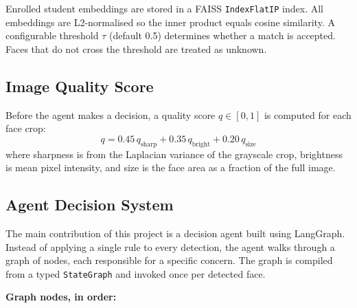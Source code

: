\documentclass[conference]{IEEEtran}
\begin{document}
Enrolled student embeddings are stored in a FAISS \texttt{IndexFlatIP} index. All embeddings are L2-normalised so the inner product equals cosine similarity. A configurable threshold $\tau$ (default 0.5) determines whether a match is accepted. Faces that do not cross the threshold are treated as unknown.

\subsection{Image Quality Score}

Before the agent makes a decision, a quality score $q \in [0,1]$ is computed for each face crop:
\[
q = 0.45\,q_{\text{sharp}} + 0.35\,q_{\text{bright}} + 0.20\,q_{\text{size}}
\]
where sharpness is from the Laplacian variance of the grayscale crop, brightness is mean pixel intensity, and size is the face area as a fraction of the full image.

\subsection{Agent Decision System}

The main contribution of this project is a decision agent built using LangGraph. Instead of applying a single rule to every detection, the agent walks through a graph of nodes, each responsible for a specific concern. The graph is compiled from a typed \texttt{StateGraph} and invoked once per detected face.

\textbf{Graph nodes, in order:}
\end{document}

